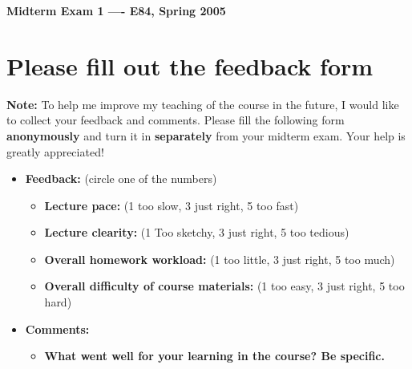\usepackage{html}

\begin{center}
{\Large \bf  Midterm Exam 1 ---- E84, Spring 2005}
\end{center}

\section*{Please fill out the feedback form}

{\bf Note: } To help me improve my teaching of the course in the future, I
would like to collect your feedback and comments. Please fill the following 
form {\bf anonymously} and turn it in {\bf separately} from your midterm 
exam. Your help is greatly appreciated!

\begin{itemize}
\item {\bf Feedback:} (circle one of the numbers)
\begin{itemize}

\item {\bf Lecture pace:} (1 too slow, 3 just right, 5 too fast)


\item {\bf Lecture clearity:} (1 Too sketchy, 3 just right, 5 too tedious)


\item {\bf Overall homework workload:} (1 too little, 3 just right, 5 too much)


\item {\bf Overall difficulty of course materials:} (1 too easy, 3 just right, 5 too hard)

\end{itemize} 

\item {\bf Comments:}
\begin{itemize}

\item {\bf What went well for your learning in the course? Be specific.}


\end{itemize}
\end{itemize}
